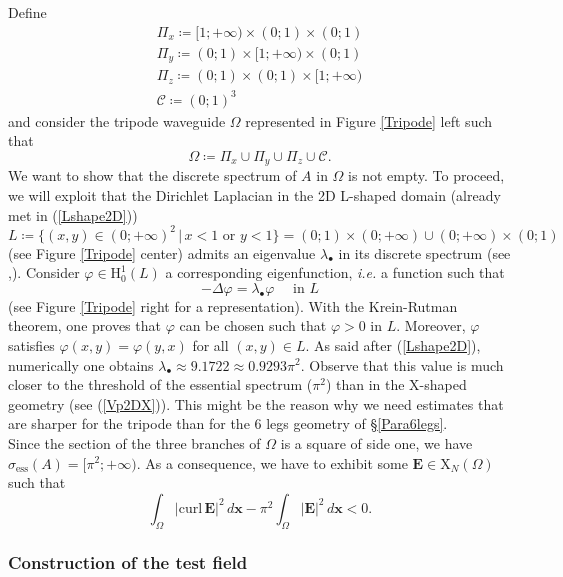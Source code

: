 \documentclass[11pt,a4paper]{article}
\newcommand{\Om}{\Omega}
\newcommand{\mrm}[1]{\mathrm{#1}}
\newcommand{\bfx}{\boldsymbol{x}}
\newcommand{\mH}{\mrm{H}}
\newcommand{\mX}{\mrm{X}}
\newcommand{\curlvec}{\boldsymbol{\mrm{curl}}\,}
\newcommand{\GL}{L}
\def\E{\boldsymbol{E}}
\begin{document}
\noindent Define
\[
\begin{array}{l}
\Pi_x\coloneqq[1;+\infty)\times(0;1)\times(0;1)\\[2pt]
\Pi_y\coloneqq(0;1)\times[1;+\infty)\times(0;1)\\[2pt]
\Pi_z\coloneqq(0;1)\times(0;1)\times[1;+\infty)\\[2pt]
\mathcal{C}\coloneqq(0;1)^3
\end{array}
\]
and consider the tripode waveguide $\Om$ represented in Figure \ref{Tripode} left such that
\begin{equation}\label{DefTripode}
\Om\coloneqq\Pi_x\cup\Pi_y\cup\Pi_z\cup\mathcal{C}.
\end{equation}
We want to show that the discrete spectrum of $A$ in $\Om$ is not empty. To proceed, we will exploit that the Dirichlet Laplacian in the 2D L-shaped domain (already met in (\ref{Lshape2D}))
\[
\GL\coloneqq\{(x,y)\in(0;+\infty)^2\,|\,x<1\mbox{ or }y<1\}=(0;1)\times(0;+\infty)\cup(0;+\infty)\times(0;1)
\]
(see Figure \ref{Tripode} center) admits an eigenvalue $\lambda_\bullet$ in its discrete spectrum (see \cite{ExSt89,ABGM91},\cite[Prop.\,4.1]{DaLR12}). Consider $\varphi\in\mH^1_0(\GL)$ a corresponding eigenfunction, \textit{i.e.} a function such that 
\begin{equation}\label{Spectral2D}
-\Delta\varphi=\lambda_\bullet\varphi\quad\mbox{ in }\GL
\end{equation}
(see Figure \ref{Tripode} right for a representation). With the Krein-Rutman theorem, one proves that $\varphi$ can be chosen such that $\varphi>0$ in $\GL$. Moreover, $\varphi$ satisfies $\varphi(x,y)=\varphi(y,x)$ for all $(x,y)\in \GL$. As said after (\ref{Lshape2D}), numerically one obtains $\lambda_\bullet\approx 9.1722 \approx 0.9293\pi^2$. Observe that this value is much closer to the threshold of the essential spectrum ($\pi^2$) than in the X-shaped geometry (see (\ref{Vp2DX})). This might be the reason why we need estimates that are sharper for the tripode than for the 6 legs geometry of \S\ref{Para6legs}.\\
\newline
Since the section of the three branches of $\Om$ is a square of side one, we have $\sigma_{\mrm{ess}}(A)=[\pi^2;+\infty)$. As a consequence, we have to exhibit some $\E\in\boldsymbol{\mX}_N(\Om)$ such that 
\[
\int_{\Om} |\curlvec\E|^2\,d\bfx-\pi^2\int_{\Om} |\E|^2\,d\bfx<0.
\]

\subsubsection*{Construction of the test field}
\end{document}
